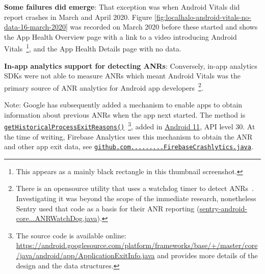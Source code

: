 \textbf{Some failures did emerge}:
That exception was when Android Vitals did report crashes in March and April 2020. Figure \ref{fig:localhalo-android-vitals-no-data-16-march-2020} was recorded on  March 2020 before these started and shows the App Health Overview page with a link to a video introducing Android Vitals~\footnote{This appears as a mainly black rectangle in this thumbnail screenshot.}, and the App Health Details page with no data.

\textbf{In-app analytics support for detecting ANRs}: 
Conversely, in-app analytics SDKs were not able to measure ANRs which meant Android Vitals was the primary source of ANR analytics for Android app developers~\footnote{There is an opensource utility that uses a watchdog timer to detect ANRs~\citep{salomonbrys_github_anr_watchdog}. Investigating it was beyond the scope of the immediate research, nonetheless Sentry used that code as a basis for their ANR reporting (\href{https://github.com/getsentry/sentry-java/blob/3f8d7b1cc869bb056c9db99b459e43f6c375784a/sentry-android-core/src/main/java/io/sentry/android/core/ANRWatchDog.java}{sentry-android-core...ANRWatchDog.java}).}. 

Note: Google has subsequently added a mechanism to enable apps to obtain information about previous ANRs when the app next started. The method is \href{https://developer.android.com/reference/kotlin/android/app/ActivityManager#gethistoricalprocessexitreasons}{\texttt{getHistoricalProcessExitReasons()}}~\footnote{The source code is available online: \url{https://android.googlesource.com/platform/frameworks/base/+/master/core/java/android/app/ApplicationExitInfo.java} and provides more details of the design and the data structures.}, added in \href{https://developer.android.com/about/versions/11}{Android 11}, API level 30.
%
At the time of writing, Firebase Analytics uses this mechanism to obtain the ANR and other app exit data, see \href{https://github.com/firebase/firebase-android-sdk/blob/73131b69b0134456441e7fa218964b6a766fcec7/firebase-crashlytics/src/main/java/com/google/firebase/crashlytics/FirebaseCrashlytics.java}{\texttt{github.com.........FirebaseCrashlytics.java}}.

